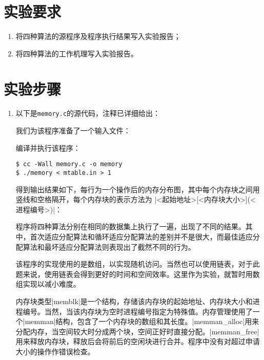 \documentclass[c5size,a4paper,nofonts]{ctexart}
\begin{document}
\section{实验要求}
\begin{enumerate}[label={(\arabic*)}]
\item 将四种算法的源程序及程序执行结果写入实验报告；
\item 将四种算法的工作机理写入实验报告。
\end{enumerate}

\fi

\section{实验步骤}

\begin{enumerate}

\item 以下是{\tt memory.c}的源代码，注释已详细给出：

{\small\linespread{1}}

我们为该程序准备了一个输入文件：


编译并执行该程序：

\begin{Verbatim}[frame=single]
$ cc -Wall memory.c -o memory
$ ./memory < mtable.in > 1
\end{Verbatim}

得到输出结果如下，每行为一个操作后的内存分布图，其中每个内存块之间用竖线和空格隔开，每个内存块的表示方法为 |<起始地址>[<内存块大小>](<进程编号>)|：


程序将四种算法分别在相同的数据集上执行了一遍，出现了不同的结果。其中，首次适应分配算法和循环适应分配算法的差别并不是很大，而最佳适应分配算法和最坏适应分配算法则表现出了截然不同的行为。

该程序的实现使用的是数组，以实现随机访问。当然也可以使用链表，对于此题来说，使用链表会得到更好的时间和空间效率。这里作为实验，就暂时用数组实现以减小难度。

内存块类型|memblk|是一个结构，存储该内存块的起始地址、内存块大小和进程编号。当然，当该内存块为空时进程编号指定为特殊值。内存管理使用了一个|memman|结构，包含了一个内存块的数组和其长度。|memman_alloc|用来分配内存，当空间较大时分成两个块，空间正好时直接分配。|memman_free|用来释放内存块，释放后会将前后的空闲块进行合并。程序中没有对超过申请大小的操作作错误检查。


\end{enumerate}
\end{document}
